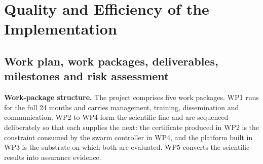 \documentclass[11pt,a4paper]{article}
\begin{document}
\section{Quality and Efficiency of the Implementation}

\subsection{Work plan, work packages, deliverables, milestones and risk assessment}

\textbf{Work-package structure.} The project comprises five work packages. WP1 runs for the full 24 months and carries management, training, dissemination and communication. WP2 to WP4 form the scientific line and are sequenced deliberately so that each supplies the next: the certificate produced in WP2 is the constraint consumed by the swarm controller in WP4, and the platform built in WP3 is the substrate on which both are evaluated. WP5 converts the scientific results into assurance evidence.
\end{document}
